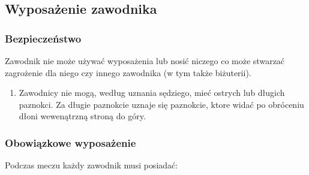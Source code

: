 \documentclass[12pt,a4paper]{article}
\begin{document}
\subsection{Wyposażenie zawodnika}

\subsubsection{Bezpieczeństwo}
Zawodnik nie może używać wyposażenia lub
nosić niczego co może stwarzać zagrożenie dla niego czy innego zawodnika
(w tym także biżuterii).

\begin{enumerate}
	\item
	      Zawodnicy nie mogą, według uznania sędziego, mieć ostrych lub długich
	      paznokci. Za długie paznokcie uznaje się paznokcie, ktore widać po
	      obróceniu dłoni wewenątrzną stroną do góry.
\end{enumerate}

\subsubsection{Obowiązkowe wyposażenie}
Podczas meczu każdy zawodnik
musi posiadać:
\end{document}
